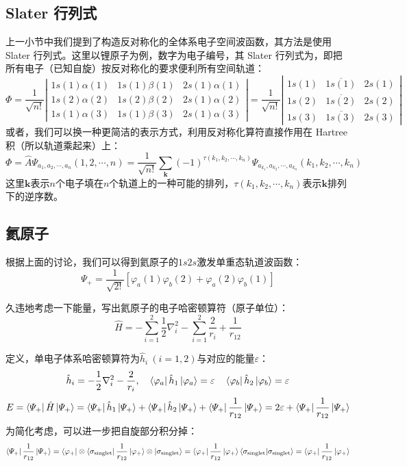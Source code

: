 \subsection{Slater 行列式}
上一小节中我们提到了构造反对称化的全体系电子空间波函数，其方法是使用 Slater 行列式。这里以锂原子为例，数字为电子编号，其 Slater 行列式为，即把所有电子（已知自旋）按反对称化的要求便利所有空间轨道：
\[\varPhi=\frac{1}{\sqrt{n!}}
\left |
\begin{array}{lll}
1s(1)\alpha(1) & 1s(1)\beta(1) & 2s(1)\alpha(1) \\
1s(2)\alpha(2) & 1s(2)\beta(2) & 2s(1)\alpha(2) \\
1s(1)\alpha(3) & 1s(1)\beta(3) & 2s(1)\alpha(3)
\end{array}
\right |
=\frac{1}{\sqrt{n!}}
\left |
\begin{array}{lll}
1s(1) & \overline{1s(1)} & 2s(1) \\
1s(2) & \overline{1s(2)} & 2s(2) \\
1s(3) & \overline{1s(3)} & 2s(3)
\end{array}
\right |
\]
或者，我们可以换一种更简洁的表示方式，利用反对称化算符直接作用在 Hartree 积（所以轨道乘起来）上：
\[\varPhi=\hat{A}\varPsi_{a_1,a_2,\cdots,a_n}(1,2,\cdots,n)=\frac{1}{\sqrt{n!}}\sum_{\bm{k}}(-1)^{\tau(k_1,k_2,\cdots,k_n)}\varPsi_{a_{k_1},a_{k_2},\cdots,a_{k_n}}(k_1,k_2,\cdots,k_n)\]
这里$\bm{k}$表示$n$个电子填在$n$个轨道上的一种可能的排列，$\tau(k_1,k_2,\cdots,k_n)$表示$\bm{k}$排列下的逆序数。
\subsection{氦原子}\label{sec:helium}
根据上面的讨论，我们可以得到氦原子的$1s2s$激发单重态轨道波函数：
\[\varPsi_{+}=\frac{1}{\sqrt{2!}}[\varphi_a(1)\varphi_b(2)+\varphi_a(2)\varphi_b(1)]\]

久违地考虑一下能量，写出氦原子的电子哈密顿算符（原子单位）：
\[\hat{H}=-\sum_{i=1}^2\frac{1}{2}\nabla^2_i-\sum_{i=1}^2\frac{2}{r_{i}}+\frac{1}{r_{12}}\]

定义，单电子体系哈密顿算符为$\hat{h}_i \ (i=1,2)$与对应的能量$\varepsilon$：
\[\hat{h}_i=-\frac{1}{2}\nabla^2_i-\frac{2}{r_{i}}, \quad \bra{\varphi_a}\hat{h}_1\ket{\varphi_a}=\varepsilon \quad \bra{\varphi_b}\hat{h}_2\ket{\varphi_b}=\varepsilon\]
\[E=\bra{\varPsi_{+}}\hat{H}\ket{\varPsi_{+}}=\bra{\varPsi_{+}}\hat{h}_1\ket{\varPsi_{+}}+\bra{\varPsi_{+}}\hat{h}_2\ket{\varPsi_{+}}+\bra{\varPsi_{+}}\frac{1}{r_{12}}\ket{\varPsi_{+}}=2\varepsilon+\bra{\varPsi_{+}}\frac{1}{r_{12}}\ket{\varPsi_{+}}\]
为简化考虑，可以进一步把自旋部分积分掉：
\[\bra{\varPsi_{+}}\frac{1}{r_{12}}\ket{\varPsi_{+}}=\bra{\varphi_{+}}\otimes\bra{\sigma_{\rm{singlet}}}\frac{1}{r_{12}}\ket{\varphi_{+}}\otimes\ket{\sigma_{\rm{singlet}}}=\bra{\varphi_{+}}\frac{1}{r_{12}}\ket{\varphi_{+}}\bra{\sigma_{\rm{singlet}}}\ket{\sigma_{\rm{singlet}}}=\bra{\varphi_{+}}\frac{1}{r_{12}}\ket{\varphi_{+}}\]

